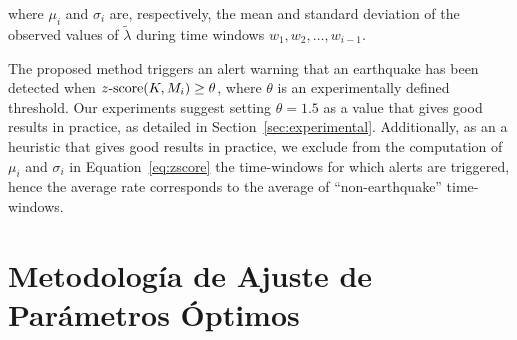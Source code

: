 \noindent where $\mu_i$ and $\sigma_i$ are, respectively, the mean and standard deviation of the observed values of $\tilde\lambda$ during time windows $w_1, w_2, \dots, w_{i-1}$.

The proposed method triggers an alert warning that an earthquake has been detected when $z\textnormal{-}\mathrm{score}(K, M_i) \ge \theta$, where $\theta$ is
an experimentally defined threshold.
%
Our experiments suggest setting $\theta=1.5$ as a value that gives good results in practice, as detailed in Section~\ref{sec:experimental}.
%
Additionally, as an a heuristic that gives good results in practice, we exclude from the computation of $\mu_i$ and $\sigma_i$ in Equation~\ref{eq:zscore} the time-windows for which alerts are triggered, hence the average rate corresponds to the average of ``non-earthquake'' time-windows.


\section{Metodología de Ajuste de Parámetros Óptimos}